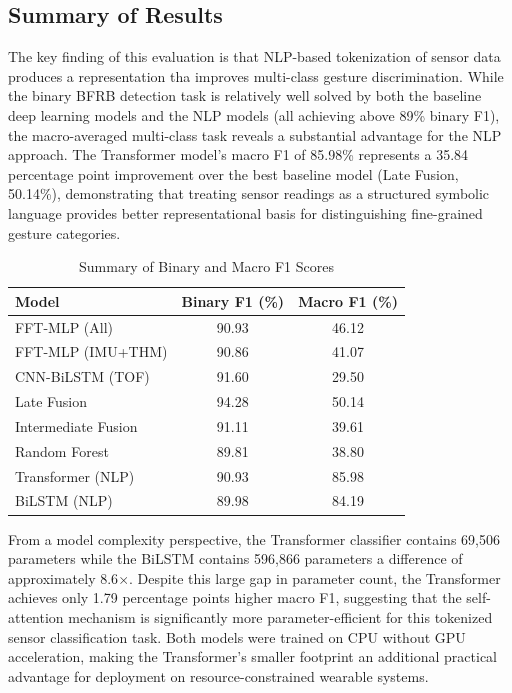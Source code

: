 \documentclass[conference]{IEEEtran}
\begin{document}
\subsection{Summary of Results}

The key finding of this evaluation is that NLP-based tokenization of sensor data produces a representation tha improves multi-class gesture discrimination. While the binary BFRB detection task is relatively well solved by both the baseline deep learning models and the NLP models (all achieving above 89\% binary F1), the macro-averaged multi-class task reveals a substantial advantage for the NLP approach. The Transformer model's macro F1 of 85.98\% represents a 35.84 percentage point improvement over the best baseline model (Late Fusion, 50.14\%), demonstrating that treating sensor readings as a structured symbolic language provides better representational basis for distinguishing fine-grained gesture categories.

\vspace{-0.23cm}
 \begin{table}[!ht]
\caption{Summary of Binary and Macro F1 Scores}
\centering
\begin{tabular}{lcc}
\hline
Model & Binary F1 (\%) & Macro F1 (\%) \\
\hline
FFT-MLP (All) & 90.93 & 46.12 \\
FFT-MLP (IMU+THM) & 90.86 & 41.07 \\
CNN-BiLSTM (TOF) & 91.60 & 29.50 \\
Late Fusion & 94.28 & 50.14 \\
Intermediate Fusion & 91.11 & 39.61 \\
Random Forest & 89.81 & 38.80 \\
Transformer (NLP) & 90.93 & 85.98 \\
BiLSTM (NLP) & 89.98 & 84.19 \\
\hline
\end{tabular}
\end{table}

From a model complexity perspective, the Transformer classifier contains 
69,506 parameters while the BiLSTM contains 596,866 parameters a 
difference of approximately 8.6$\times$. Despite this large gap in 
parameter count, the Transformer achieves only 1.79 percentage points 
higher macro F1, suggesting that the self-attention mechanism is 
significantly more parameter-efficient for this tokenized sensor 
classification task. Both models were trained on CPU without GPU 
acceleration, making the Transformer's smaller footprint an additional 
practical advantage for deployment on resource-constrained wearable systems.
\end{document}
